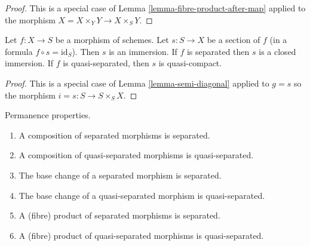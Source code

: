 \begin{proof}
This is a special case of Lemma \ref{lemma-fibre-product-after-map}
applied to the morphism $X = X \times_Y Y \to X \times_S Y$.
\end{proof}

\begin{lemma}
\label{lemma-section-immersion}
Let $f : X \to S$ be a morphism of schemes.
Let $s : S \to X$ be a section of $f$ (in a formula $f \circ s = \text{id}_S$).
Then $s$ is an immersion.
If $f$ is separated then $s$ is a closed immersion.
If $f$ is quasi-separated, then $s$ is quasi-compact.
\end{lemma}

\begin{proof}
This is a special case of Lemma \ref{lemma-semi-diagonal} applied to
$g =s$ so the morphism $i = s : S \to S \times_S X$.
\end{proof}

\begin{lemma}
\label{lemma-separated-permanence}
Permanence properties.
\begin{enumerate}
\item A composition of separated morphisms is separated.
\item A composition of quasi-separated morphisms is quasi-separated.
\item The base change of a separated morphism is separated.
\item The base change of a quasi-separated morphism is quasi-separated.
\item A (fibre) product of separated morphisms is separated.
\item A (fibre) product of quasi-separated morphisms is quasi-separated.
\end{enumerate}
\end{lemma}

